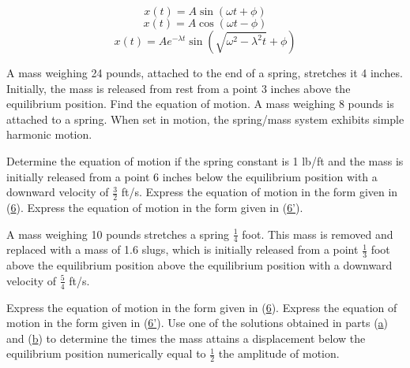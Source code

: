 \documentclass[12pt]{report}
\begin{document}
\renewcommand\theequation{\arabic{equation}}
\setcounter{equation}{5}
\begin{equation} x(t) = A\sin(\omega t + \phi)\label{eq:6}\end{equation}
\renewcommand\theequation{\arabic{equation}'}
\setcounter{equation}{5}
\begin{equation} x(t) = A\cos(\omega t - \phi) \label{eq:6'}\end{equation}
\renewcommand\theequation{\arabic{equation}}
\setcounter{equation}{22}
\begin{equation} x(t) = Ae^{-\lambda t}\sin\left( \sqrt{\omega^{2} - \lambda^{2}t} + \phi \right) \label{eq:23}\end{equation}

\begin{enumerate}[label=\arabic*.,start=3]
	\problem A mass weighing 24 pounds, attached to the end of a spring, stretches it 4 inches. Initially, the mass is released from rest from a point 3 inches above the equilibrium position. Find the equation of motion.
	\setcounter{enumi}{8}
	\problem A mass weighing 8 pounds is attached to a spring. When set in motion, the spring/mass system exhibits simple harmonic motion.
	\begin{enumerate}[label=(\alph*)]
	    \subproblem Determine the equation of motion if the spring constant is 1 lb/ft and the mass is initially released from a point 6 inches below the equilibrium position with a downward velocity of $\frac{3}{2}$ ft/s.
		\subproblem Express the equation of motion in the form given in (\hyperref[eq:6]{6}).
		\subproblem Express the equation of motion in the form given in (\hyperref[eq:6']{6'}).
	\end{enumerate}
	\problem A mass weighing 10 pounds stretches a spring $\frac{1}{4}$ foot. This mass is removed and replaced with a mass of 1.6 slugs, which is initially released from a point $\frac{1}{3}$ foot above the equilibrium position above the equilibrium position with a downward velocity of $\frac{5}{4}$ ft/s.
	\begin{enumerate}[label=(\alph*)]
	    \subproblem Express the equation of motion in the form given in (\hyperref[eq:6]{6}).
	    \subproblem Express the equation of motion in the form given in (\hyperref[eq:6']{6'}).
		\subproblem Use one of the solutions obtained in parts (\hyperref[prb:10a]{a}) and (\hyperref[prb:10b]{b}) to determine the times the mass attains a displacement below the equilibrium position numerically equal to $\frac{1}{2}$ the amplitude of motion.

\end{enumerate}
\end{enumerate}
\end{document}
